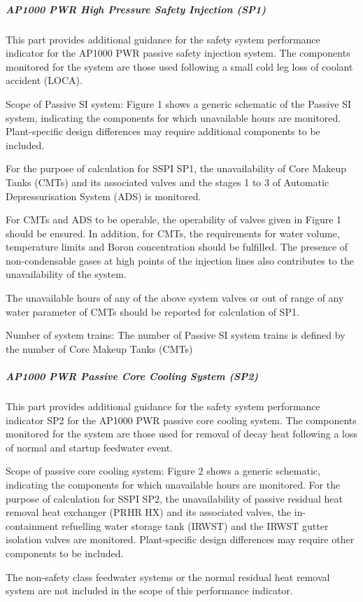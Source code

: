 \subparagraph{AP1000 PWR High Pressure Safety Injection (SP1)}

This part provides additional guidance for the safety system
performance indicator for the AP1000 PWR passive safety injection
system. The components monitored for the system are those used
following a small cold leg loss of coolant accident (LOCA).

Scope of Passive SI system: Figure 1 shows a generic schematic of the
Passive SI system, indicating the components for which unavailable
hours are monitored. Plant-specific design differences may require
additional components to be included.

For the purpose of calculation for SSPI SP1, the unavailability of
Core Makeup Tanks (CMTs) and its associated valves and the stages 1 to
3 of Automatic Depressurisation System (ADS) is monitored.

For CMTs and ADS to be operable, the operability of valves given in
Figure 1 should be ensured. In addition, for CMTs, the requirements
for water volume, temperature limits and Boron concentration should be
fulfilled. The presence of non-condensable gases at high points of the
injection lines also contributes to the unavailability of the system.

The unavailable hours of any of the above system valves or out of
range of any water parameter of CMTs should be reported for
calculation of SP1.

Number of system trains:  The number of Passive SI system trains is defined by the number of Core Makeup Tanks (CMTs)

\subparagraph{AP1000 PWR Passive Core Cooling System (SP2)}

This part provides additional guidance for the safety system
performance indicator SP2 for the AP1000 PWR passive core cooling
system. The components monitored for the system are those used for
removal of decay heat following a loss of normal and startup feedwater
event.

Scope of passive core cooling system:  Figure 2 shows a generic
schematic, indicating the components for which unavailable hours are
monitored. For the purpose of calculation for SSPI SP2, the
unavailability of passive residual heat removal heat exchanger (PRHR
HX) and its associated valves, the in-containment refuelling water
storage tank (IRWST) and the IRWST gutter isolation valves are
monitored. Plant-specific design differences may require other
components to be included.

The non-safety class feedwater systems or the normal residual heat
removal system are not included in the scope of this performance
indicator.

